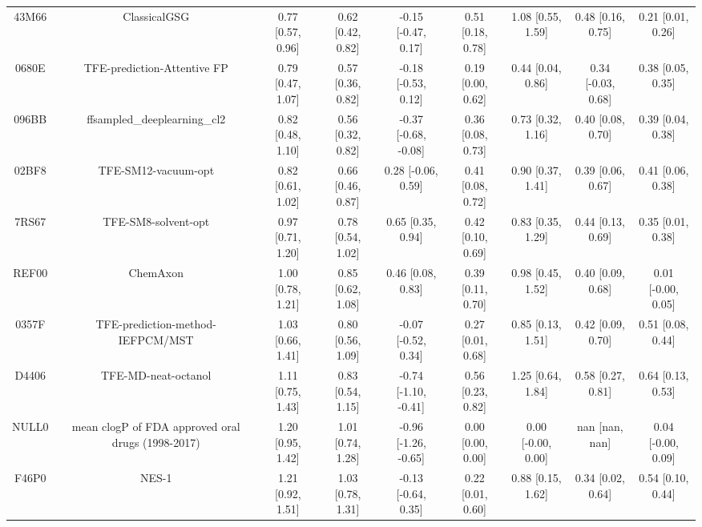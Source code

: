 \documentclass{article}
\begin{document}
\begin{center}
\begin{longtable}{|ccccccccc|}
 43M66 &                                       ClassicalGSG &  0.77 [0.57, 0.96] &  0.62 [0.42, 0.82] &   -0.15 [-0.47, 0.17] &  0.51 [0.18, 0.78] &     1.08 [0.55, 1.59] &     0.48 [0.16, 0.75] &     0.21 [0.01, 0.26] \\
 0680E &                        TFE-prediction-Attentive FP &  0.79 [0.47, 1.07] &  0.57 [0.36, 0.82] &   -0.18 [-0.53, 0.12] &  0.19 [0.00, 0.62] &     0.44 [0.04, 0.86] &    0.34 [-0.03, 0.68] &     0.38 [0.05, 0.35] \\
 096BB &                       ffsampled\_deeplearning\_cl2 &  0.82 [0.48, 1.10] &  0.56 [0.32, 0.82] &  -0.37 [-0.68, -0.08] &  0.36 [0.08, 0.73] &     0.73 [0.32, 1.16] &     0.40 [0.08, 0.70] &     0.39 [0.04, 0.38] \\
 02BF8 &                                TFE-SM12-vacuum-opt &  0.82 [0.61, 1.02] &  0.66 [0.46, 0.87] &    0.28 [-0.06, 0.59] &  0.41 [0.08, 0.72] &     0.90 [0.37, 1.41] &     0.39 [0.06, 0.67] &     0.41 [0.06, 0.38] \\
 7RS67 &                                TFE-SM8-solvent-opt &  0.97 [0.71, 1.20] &  0.78 [0.54, 1.02] &     0.65 [0.35, 0.94] &  0.42 [0.10, 0.69] &     0.83 [0.35, 1.29] &     0.44 [0.13, 0.69] &     0.35 [0.01, 0.38] \\
 REF00 &                                           ChemAxon &  1.00 [0.78, 1.21] &  0.85 [0.62, 1.08] &     0.46 [0.08, 0.83] &  0.39 [0.11, 0.70] &     0.98 [0.45, 1.52] &     0.40 [0.09, 0.68] &    0.01 [-0.00, 0.05] \\
 0357F &                   TFE-prediction-method-IEFPCM/MST &  1.03 [0.66, 1.41] &  0.80 [0.56, 1.09] &   -0.07 [-0.52, 0.34] &  0.27 [0.01, 0.68] &     0.85 [0.13, 1.51] &     0.42 [0.09, 0.70] &     0.51 [0.08, 0.44] \\
 D4406 &                                TFE-MD-neat-octanol &  1.11 [0.75, 1.43] &  0.83 [0.54, 1.15] &  -0.74 [-1.10, -0.41] &  0.56 [0.23, 0.82] &     1.25 [0.64, 1.84] &     0.58 [0.27, 0.81] &     0.64 [0.13, 0.53] \\
 NULL0 &  mean clogP of FDA approved oral drugs (1998-2017) &  1.20 [0.95, 1.42] &  1.01 [0.74, 1.28] &  -0.96 [-1.26, -0.65] &  0.00 [0.00, 0.00] &    0.00 [-0.00, 0.00] &        nan [nan, nan] &    0.04 [-0.00, 0.09] \\
 F46P0 &                                              NES-1 &  1.21 [0.92, 1.51] &  1.03 [0.78, 1.31] &   -0.13 [-0.64, 0.35] &  0.22 [0.01, 0.60] &     0.88 [0.15, 1.62] &     0.34 [0.02, 0.64] &     0.54 [0.10, 0.44] \\

\end{longtable}
\end{center}
\end{document}
